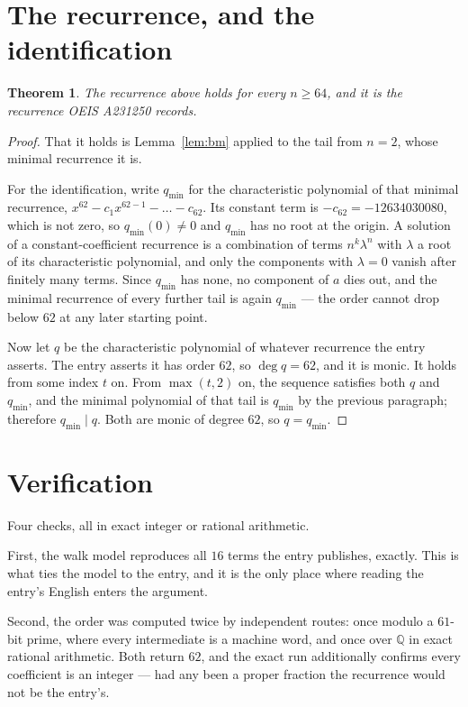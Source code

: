 \documentclass[11pt,a4paper]{article}
\theoremstyle{plain}
\newtheorem{theorem}{Theorem}
\theoremstyle{definition}
\begin{document}
\section{The recurrence, and the identification}

\begin{theorem}
The recurrence above holds for every $n\ge64$, and it is the recurrence OEIS A231250 records.
\end{theorem}

\begin{proof}
That it holds is Lemma~\ref{lem:bm} applied to the tail from $n=2$, whose minimal
recurrence it is.

For the identification, write $q_{\min}$ for the characteristic polynomial of that minimal
recurrence, $x^{62}-c_1x^{62-1}-\dots-c_{62}$. Its constant term is
$-c_{62}=-12634030080$, which is not zero, so $q_{\min}(0)\neq0$ and $q_{\min}$ has no
root at the origin. A solution of a constant-coefficient recurrence is a combination of terms
$n^{k}\lambda^{n}$ with $\lambda$ a root of its characteristic polynomial, and only the
components with $\lambda=0$ vanish after finitely many terms. Since $q_{\min}$ has none, no
component of $a$ dies out, and the minimal recurrence of every further tail is again
$q_{\min}$ --- the order cannot drop below $62$ at any later starting point.

Now let $q$ be the characteristic polynomial of whatever recurrence the entry asserts. The
entry asserts it has order $62$, so $\deg q=62$, and it is monic. It holds from some
index $t$ on. From $\max(t,2)$ on, the sequence satisfies both $q$ and $q_{\min}$, and
the minimal polynomial of that tail is $q_{\min}$ by the previous paragraph; therefore
$q_{\min}\mid q$. Both are monic of degree $62$, so $q=q_{\min}$.
\end{proof}

\section{Verification}

Four checks, all in exact integer or rational arithmetic.

First, the walk model reproduces all $16$ terms the entry publishes, exactly. This is
what ties the model to the entry, and it is the only place where reading the entry's English
enters the argument.

Second, the order was computed twice by independent routes: once modulo a $61$-bit prime, where
every intermediate is a machine word, and once over $\mathbb{Q}$ in exact rational arithmetic.
Both return $62$, and the exact run additionally confirms every coefficient is an integer
--- had any been a proper fraction the recurrence would not be the entry's.
\end{document}
